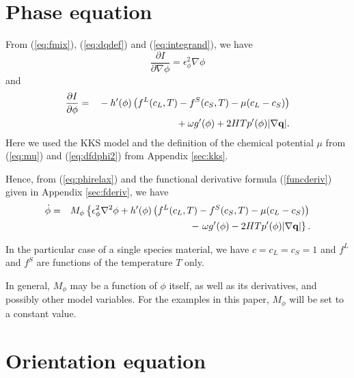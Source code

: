 %
\section{Phase equation}

From (\ref{eq:fmix}), (\ref{eq:dqdef}) and (\ref{eq:integrand}), we
have
%
\begin{equation}
  \frac{\partial I}{\partial \nabla \phi} = \epsilon_{\phi}^2 \nabla \phi
\end{equation}
%
and
%
\begin{eqnarray}
  \frac{\partial I}{\partial \phi} =
    & & {} - h'(\phi)\left(f^L(c_L,T)-f^S(c_S,T) - \mu (c_L - c_S) \right)
    \nonumber \\
    & & {} + \omega g'(\phi) +  2HTp'(\phi) | \nabla {\bf q} |.
\end{eqnarray}
%
Here we used the KKS model and the definition of the chemical
potential $\mu$ from (\ref{eq:mu})
%
%
and (\ref{eq:dfdphi2}) from Appendix \ref{sec:kks}.

Hence, from (\ref{eq:phirelax}) and the functional derivative formula (\ref{funcderiv})
given in Appendix \ref{sec:fderiv}, we have
%
\begin{eqnarray}
  \dot{\phi} = & & M_\phi\left\{ \epsilon_{\phi}^2 \nabla^2 \phi
    + h'(\phi)\left(f^L(c_L,T)-f^S(c_S,T) -\mu (c_L - c_S) \right)
    \right .
    \nonumber \\
    & & {} - \left . \omega g'(\phi)
    -  2HTp'(\phi) | \nabla {\bf q} | \right\}.
\label{eq:phaseeom}
\end{eqnarray}

In the particular case of a single species material, we have
$c=c_L=c_S=1$ and $f^L$ and $f^S$ are functions of the temperature $T$ only.

In general, $M_\phi$ may be a function of $\phi$ itself, as well as
its derivatives, and possibly other model variables.  For the examples
in this paper, $M_\phi$ will be set to a constant value.

%
\section{Orientation equation}
\label{sec:orientationmodel}

